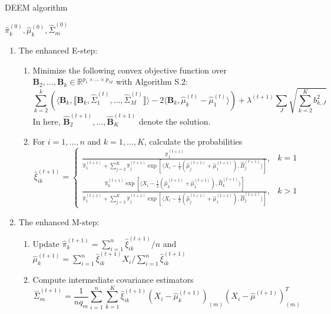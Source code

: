 \documentclass[11pt]{article}
\newcommand{\wh}{\widehat}
\begin{document}
\begin{algorithm}
    \caption{DEEM algorithm}\label{alg:DEEM}
    \begin{algorithmic}[1]
       \Initialize \; \(\hat{\pi}^{(0)}_k, \hat{\mu}^{(0)}_k, \hat{\Sigma}^{(0)}_m\)
       \EndInitialize
        
       \begin{enumerate}
           \item The enhanced E-step: 
           \begin{enumerate}
               \item Minimize the following convex objective function over \(\mathbf{B}_{2},\dots,\mathbf{B}_k\in \mathbb{R}^{p_1\times \dots \times p_M}\) with Algorithm S.2:
               \[\sum^k_{k=2}(\langle\mathbf{B}_k,\llbracket\mathbf{B}_k,\wh\Sigma^{(t)}_1,\dots,\wh\Sigma^{(t)}_M\rrbracket\rangle-2\langle\mathbf{B}_k,\wh\mu^{(t)}_k-\wh\mu^{(t)}_1\rangle)+\lambda^{(t+1)}\sum_J\sqrt{\sum^K_{k=2}b^2_{k,J}}\]
               In here, \(\hat{\mathbf{B}}^{(t+1)}_2,\dots,\hat{\mathbf{B}}^{(t+1)}_K\) denote the solution. 
               \item For \(i=1,\dots,n\) and \(k=1,\dots,K\), calculate the probabilities 
               \[ \wh\xi_{ik}^{(t+1)}=\begin{cases}
                    \frac{\wh\pi_1^{(t+1)}}{\wh\pi_1^{(t+1)} + \sum_{j=2}^K \wh \pi_j ^{(t+1)}  \exp\left[ \langle X_i - \frac{1}{2}(\wh \mu_j^{(t+1)} +\wh \mu_1^{(t+1)} ) , \wh B_j^{(t+1)}  \rangle \right]}, & k=1\\
                    \frac{\wh\pi_k^{(t+1)}\exp\left[ \langle X_i - \frac{1}{2}(\wh \mu_k^{(t+1)} +\wh \mu_1^{(t+1)} ), \wh B_k^{(t+1)}  \rangle \right]}{\wh\pi_1^{(t+1)} + \sum_{j=2}^K \wh \pi_j ^{(t+1)}  \exp\left[ \langle X_i - \frac{1}{2}(\wh \mu_j^{(t+1)} +\wh \mu_1^{(t+1)} ) , \wh B_j^{(t+1)}  \rangle \right]}, & k>1
               \end{cases}\]
           \end{enumerate}
           \item The enhanced M-step:
               \begin{enumerate}
                   \item Update \(\wh\pi^{(t+1)}_k=\sum^n_{i=1}\wh\xi^{(t+1)}_{ik}/n\) and \(\wh\mu^{(t+1)}_k=\sum^n_{i=1}\wh\xi^{(t+1)}_{ik}X_i/\sum^n_{i=1}\wh\xi^{(t+1)}_{ik}\)
                   \item Compute intermediate covariance estimators 
                   \[\overset\smile\Sigma^{(t+1)}_m=\frac{1}{nq_m}\sum^n_{i=1}\sum^K_{k=1}\wh\xi^{(t+1)}_{ik}(X_i-\wh\mu^{(t+1)}_k)_{(m)}(X_i-\wh\mu^{(t+1)})^T_{(m)}\]

\end{enumerate}
\end{enumerate}
\end{algorithmic}
\end{algorithm}
\end{document}
